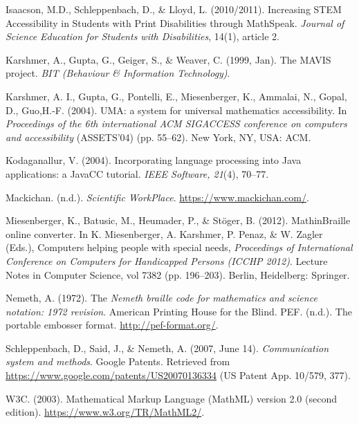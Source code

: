 \documentclass[11.5pt]{sig-alternate} %
\begin{document}
Isaacson, M.D., Schleppenbach, D., \& Lloyd, L. (2010/2011). Increasing STEM Accessibility in Students with Print Disabilities through MathSpeak. \textit{Journal of Science Education for Students with Disabilities}, 14(1), article 2. 

Karshmer, A., Gupta, G., Geiger, S., \& Weaver, C. (1999, Jan). The MAVIS project. \textit{BIT (Behaviour \& Information Technology)}.

Karshmer, A. I., Gupta, G., Pontelli, E., Miesenberger, K., Ammalai, N., Gopal, D., Guo,H.-F. (2004). UMA: a system for universal mathematics accessibility. In \textit{Proceedings of the 6th international ACM SIGACCESS conference on computers and accessibility} (ASSETS’04) (pp. 55–62). New York, NY, USA: ACM.

Kodaganallur, V. (2004). Incorporating language processing into Java applications: a JavaCC tutorial. \textit{IEEE Software, 21}(4), 70–77.

Mackichan. (n.d.). \textit{Scientific WorkPlace}. \url{https://www.mackichan.com/}.

Miesenberger, K., Batusic, M., Heumader, P., \& Stöger, B. (2012). MathinBraille online converter. In K. Miesenberger, A. Karshmer, P. Penaz, \& W. Zagler (Eds.), Computers helping people with special needs, \textit{Proceedings of International Conference on Computers for Handicapped Persons (ICCHP 2012)}. Lecture Notes in Computer Science, vol 7382 (pp. 196–203). Berlin, Heidelberg: Springer.

Nemeth, A. (1972). The \textit{Nemeth braille code for mathematics and science notation: 1972 revision}. American Printing House for the Blind. PEF. (n.d.). The portable embosser format. \url{http://pef-format.org/}.

Schleppenbach, D., Said, J., \& Nemeth, A. (2007, June 14). \textit{Communication system and methods}. Google Patents. Retrieved from \url{https://www.google.com/patents/US20070136334} (US Patent App. 10/579, 377).

W3C. (2003). Mathematical Markup Language (MathML) version 2.0 (second edition). \url{https://www.w3.org/TR/MathML2/}.
\end{document}
